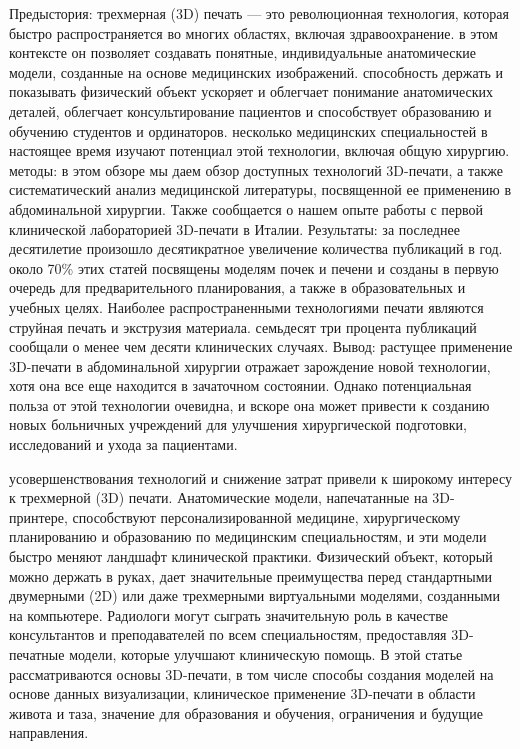 Предыстория: трехмерная (3D) печать — это революционная технология, которая
быстро распространяется во многих областях, включая здравоохранение. в этом
контексте он позволяет создавать понятные, индивидуальные анатомические модели,
созданные на основе медицинских изображений. способность держать и показывать
физический объект ускоряет и облегчает понимание анатомических деталей,
облегчает консультирование пациентов и способствует образованию и обучению
студентов и ординаторов. несколько медицинских специальностей в настоящее время
изучают потенциал этой технологии, включая общую хирургию. методы: в этом обзоре
мы даем обзор доступных технологий 3D-печати, а также систематический анализ
медицинской литературы, посвященной ее применению в абдоминальной хирургии.
Также сообщается о нашем опыте работы с первой клинической лабораторией
3D-печати в Италии. Результаты: за последнее десятилетие произошло десятикратное
увеличение количества публикаций в год. около 70\% этих статей посвящены моделям
почек и печени и созданы в первую очередь для предварительного планирования, а
также в образовательных и учебных целях. Наиболее распространенными технологиями
печати являются струйная печать и экструзия материала. семьдесят три процента
публикаций сообщали о менее чем десяти клинических случаях. Вывод: растущее
применение 3D-печати в абдоминальной хирургии отражает зарождение новой
технологии, хотя она все еще находится в зачаточном состоянии. Однако
потенциальная польза от этой технологии очевидна, и вскоре она может привести к
созданию новых больничных учреждений для улучшения хирургической подготовки,
исследований и ухода за пациентами.\cite{31605218}

усовершенствования технологий и снижение затрат привели к широкому интересу к
трехмерной (3D) печати. Анатомические модели, напечатанные на 3D-принтере,
способствуют персонализированной медицине, хирургическому планированию и
образованию по медицинским специальностям, и эти модели быстро меняют ландшафт
клинической практики. Физический объект, который можно держать в руках, дает
значительные преимущества перед стандартными двумерными (2D) или даже
трехмерными виртуальными моделями, созданными на компьютере. Радиологи могут
сыграть значительную роль в качестве консультантов и преподавателей по всем
специальностям, предоставляя 3D-печатные модели, которые улучшают клиническую
помощь. В этой статье рассматриваются основы 3D-печати, в том числе способы
создания моделей на основе данных визуализации, клиническое применение 3D-печати
в области живота и таза, значение для образования и обучения, ограничения и
будущие направления.\cite{29619525}


